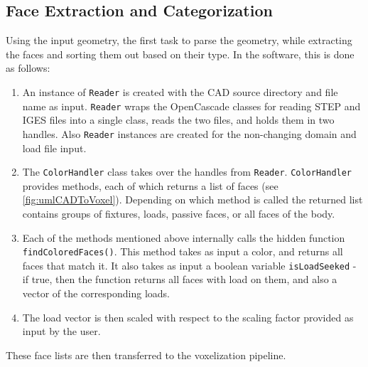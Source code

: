 \subsection{Face Extraction and Categorization}
\label{sec: FaceExtraction}

Using the input geometry, the first task to parse the geometry, while extracting the faces and sorting them out based on their type. In the software, this is done as follows:

\begin{enumerate}
	\item An instance of \lstinline|Reader| is created with the CAD source directory and file name as input. \lstinline|Reader| wraps the OpenCascade classes for reading STEP and IGES files into a single class, reads the two files, and holds them in two handles. Also \lstinline|Reader| instances are created for the non-changing domain and load file input.
	\item The \lstinline|ColorHandler| class takes over the handles from \lstinline|Reader|. \lstinline|ColorHandler| provides methods, each of which returns a list of faces (see \autoref{fig:umlCADToVoxel}). Depending on which method is called the returned list contains groups of fixtures, loads, passive faces, or all faces of the body.
	\item Each of the methods mentioned above internally calls the hidden function \lstinline|findColoredFaces()|. This method takes as input a color, and returns all faces that match it. It also takes as input a boolean variable \lstinline|isLoadSeeked| - if true, then the function returns all faces with load on them, and also a vector of the corresponding loads.
	\item The load vector is then scaled with respect to the scaling factor provided as input by the user.
\end{enumerate}

These face lists are then transferred to the voxelization pipeline.
